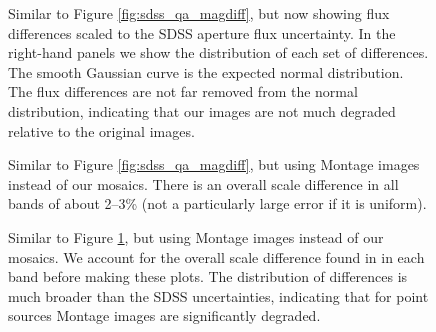 \clearpage
{}
\begin{figure}
\figurenum{\fignum}
\caption{\label{fig:sdss_qa_scaled} Similar to Figure
\ref{fig:sdss_qa_magdiff}, but now showing flux differences scaled to
the SDSS aperture flux uncertainty. In the right-hand panels we show
the distribution of each set of differences.  The smooth Gaussian
curve is the expected normal distribution. The flux differences are
not far removed from the normal distribution, indicating that our
images are not much degraded relative to the original images.}
\end{figure}


\clearpage
{}
\begin{figure}
\figurenum{\fignum}
\caption{\label{fig:montage_qa_magdiff} Similar to Figure
\ref{fig:sdss_qa_magdiff}, but using Montage images instead of our
mosaics. There is an overall scale difference in all bands of about
2--3\% (not a particularly large error if it is uniform). }
\end{figure}

\clearpage
{}
\begin{figure}
\figurenum{\fignum}
\caption{\label{fig:montage_qa_scaled} Similar to Figure
\ref{fig:sdss_qa_scaled}, but using Montage images instead of our
mosaics. We account for the overall scale difference found in in each band
before making these plots. The distribution of differences is much
broader than the SDSS uncertainties, indicating that for point sources
Montage images are significantly degraded.}
\end{figure}


